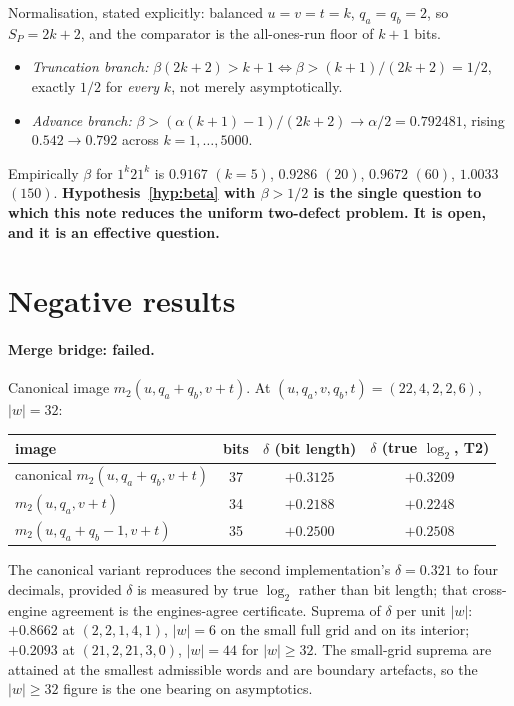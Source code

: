 \documentclass[11pt,a4paper]{article}
\theoremstyle{plain}
\theoremstyle{definition}
\newcommand{\al}{\alpha}
\begin{document}
Normalisation, stated explicitly: balanced $u=v=t=k$, $q_a=q_b=2$, so
$S_P=2k+2$, and the comparator is the all-ones-run floor of $k+1$ bits.
\begin{itemize}[nosep]
\item \emph{Truncation branch:} $\beta(2k+2)>k+1\iff\beta>(k+1)/(2k+2)=1/2$,
exactly $1/2$ for \emph{every} $k$, not merely asymptotically.
\item \emph{Advance branch:} $\beta>(\al(k+1)-1)/(2k+2)\to\al/2=0.792481$,
rising $0.542\to0.792$ across $k=1,\dots,5000$.
\end{itemize}
Empirically $\beta$ for $1^{k}21^{k}$ is $0.9167$ $(k=5)$, $0.9286$ $(20)$,
$0.9672$ $(60)$, $1.0033$ $(150)$. \textbf{Hypothesis~\ref{hyp:beta} with
$\beta>1/2$ is the single question to which this note reduces the uniform
two-defect problem. It is open, and it is an effective question.}

\section{Negative results}\label{sec:neg}

\paragraph{Merge bridge: failed.}
Canonical image $m_2(u,q_a+q_b,v+t)$. At $(u,q_a,v,q_b,t)=(22,4,2,2,6)$,
$|w|=32$:

\begin{center}
\begin{tabular}{@{}lccc@{}}
\toprule
image & bits & $\delta$ (bit length) & $\delta$ (true $\log_2$, T2)\\
\midrule
canonical $m_2(u,q_a+q_b,v+t)$ & 37 & $+0.3125$ & $\mathbf{+0.3209}$\\
$m_2(u,q_a,v+t)$ & 34 & $+0.2188$ & $+0.2248$\\
$m_2(u,q_a+q_b-1,v+t)$ & 35 & $+0.2500$ & $+0.2508$\\
\bottomrule
\end{tabular}
\end{center}

\noindent The canonical variant reproduces the second implementation's
$\delta=0.321$ to four decimals, provided $\delta$ is measured by true $\log_2$
rather than bit length; that cross-engine agreement is the engines-agree
certificate. Suprema of $\delta$ per unit $|w|$: $+0.8662$ at $(2,2,1,4,1)$,
$|w|=6$ on the small full grid and on its interior; $+0.2093$ at
$(21,2,21,3,0)$, $|w|=44$ for $|w|\ge32$. The small-grid suprema are attained
at the smallest admissible words and are boundary artefacts, so the
$|w|\ge 32$ figure is the one bearing on asymptotics.
\end{document}
